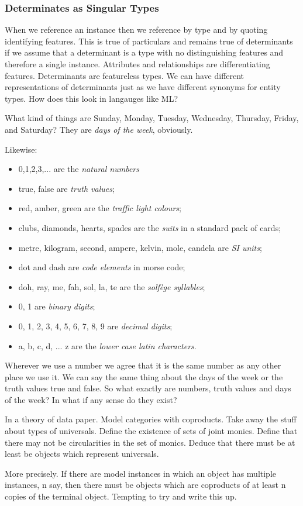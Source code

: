 \subsubsection{Determinates as Singular Types}
\mynote 
When we reference an instance then we reference by type and by quoting identifying features.
\mynote 
This is true of particulars and remains true of determinants
if we assume that a determinant is a type with no distinguishing features and
therefore a single instance.
\mynote
Attributes and relationships are differentiating features. 
Determinants are featureless types. We can have different representations of
determinants just as we have different synonyms for entity types.
\mynote 
How does this look in langauges like ML?

\mynote 
 What kind of things are Sunday, Monday, Tuesday, Wednesday, Thursday, Friday, and Saturday? They are \textit{days of the week}, obviously.

Likewise:
\begin{itemize}
  \item 0,1,2,3,... are the \textit{natural numbers}
  \item true, false are \textit{truth values};
  \item red, amber, green are the \textit{traffic light colours};
  \item clubs, diamonds, hearts, spades are the \textit{suits} in a standard pack of cards;
  \item metre, kilogram, second, ampere, kelvin, mole, candela are \textit{SI units};
  \item dot and dash are \textit{code elements} in morse code;
  \item doh, ray, me, fah, sol, la, te are the \textit{solfège syllables};
  \item 0, 1 are \textit{binary digits};
  \item 0, 1, 2, 3, 4, 5, 6, 7, 8, 9 are \textit{decimal digits};
  \item a, b, c, d, ... z are the \textit{lower case latin characters}.
\end{itemize}

\mynote  Wherever we use a number we agree that it is the same number as any other place we use it. We can say the same thing about the days of the week or
the truth values true and false. 
So what exactly are  numbers, truth values and days of the week? In what if any sense do they exist? 
\begin{notebox}[theory]
In a theory of data paper. Model categories with coproducts. Take away
the stuff about types of universals. Define the existence of sets of joint monics. 
Define that there may not be circularities in the set of monics. Deduce that there must be at least be objects which represent universals.

More precisely. If there are model instances in which an object has multiple instances,
n say, then there must be objects which are coproducts of at least n copies of the terminal object. Tempting to try and write this up. 
\end{notebox}

